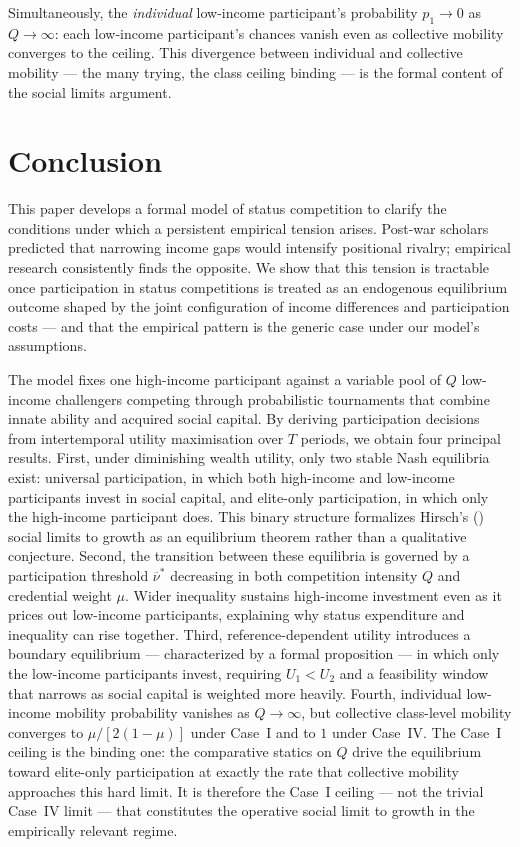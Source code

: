 \documentclass[
    oneside,
    fontsize=10pt,leqno]{article}
\begin{document}
Simultaneously, the \emph{individual} low-income participant's probability
$p_{1}\to0$ as $Q\to\infty$: each low-income participant's chances vanish
even as collective mobility converges to the ceiling. This divergence
between individual and collective mobility --- the many trying, the
class ceiling binding --- is the formal content of the social limits
argument.

\section{\label{sec:Conclusion}Conclusion}

\noindent

This paper develops a formal model of status competition to clarify
the conditions under which a persistent empirical tension arises.
Post-war scholars predicted that narrowing income gaps would intensify
positional rivalry; empirical research consistently finds the opposite.
We show that this tension is tractable once participation in status
competitions is treated as an endogenous equilibrium outcome shaped
by the joint configuration of income differences and participation
costs --- and that the empirical pattern is the generic case under
our model's assumptions.

The model fixes one high-income participant against a variable pool of $Q$
low-income challengers competing through probabilistic tournaments that
combine innate ability and acquired social capital. By deriving
participation decisions from intertemporal utility maximisation over
$T$ periods, we obtain four principal results. First, under diminishing
wealth utility, only two stable Nash equilibria exist: universal
participation, in which both high-income and low-income participants invest in social capital,
and elite-only participation, in which only the high-income participant does. This binary
structure formalizes Hirsch's (\citeyear{HirschSocialLimits}) social
limits to growth as an equilibrium theorem rather than a qualitative
conjecture. Second, the transition between these equilibria is governed
by a participation threshold $\overline{\nu}^{*}$ decreasing in
both competition intensity $Q$ and credential weight $\mu$.
Wider inequality sustains high-income investment
even as it prices out low-income participants, explaining why status expenditure
and inequality can rise together. Third, reference-dependent utility introduces a
boundary equilibrium --- characterized by a formal proposition --- in
which only the low-income participants invest, requiring $U_{1}<U_{2}$ and a feasibility
window that narrows as social capital is weighted more heavily. Fourth,
individual low-income mobility probability vanishes as $Q\to\infty$, but
collective class-level mobility converges to $\mu/[2(1-\mu)]$ under
Case~I and to $1$ under Case~IV. The Case~I ceiling is the binding
one: the comparative statics on $Q$ drive the equilibrium toward
elite-only participation at exactly the rate that collective mobility
approaches this hard limit. It is therefore the Case~I ceiling ---
not the trivial Case~IV limit --- that constitutes the operative
social limit to growth in the empirically relevant regime.
\end{document}
